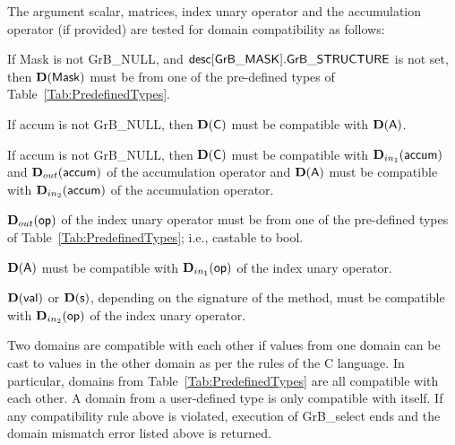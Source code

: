 The argument scalar, matrices, index unary operator and the accumulation 
operator (if provided) are tested for domain compatibility as follows:
\begin{enumerate}
    \item If {\sf Mask} is not {\sf GrB\_NULL}, and ${\sf desc[GrB\_MASK].GrB\_STRUCTURE}$
    is not set, then $\bold{D}({\sf Mask})$ must be from one of the pre-defined types of 
    Table~\ref{Tab:PredefinedTypes}.

    \item If {\sf accum} is not {\sf GrB\_NULL}, then $\bold{D}({\sf C})$ must be 
	compatible with $\bold{D}({\sf A})$.

    \item If {\sf accum} is not {\sf GrB\_NULL}, then $\bold{D}({\sf C})$ must be
    compatible with $\mbox{$\mathbf{D}_{in_{1}}$}({\sf accum})$ and $\mbox{$\mathbf{D}_{out}$}({\sf accum})$ of the accumulation operator and 
    $\bold{D}({\sf A})$ must be compatible with $\mbox{$\mathbf{D}_{in_{2}}$}({\sf accum})$ of the accumulation operator.

	\item $\mbox{$\mathbf{D}_{out}$}({\sf op})$ of the index unary operator must be from one of the pre-defined types of 
    Table~\ref{Tab:PredefinedTypes}; i.e., castable to {\sf bool}.

    \item $\bold{D}({\sf A})$ must be compatible with $\mbox{$\mathbf{D}_{in_{1}}$}({\sf op})$ of the index unary operator.
    
{\color{red}
    \item $\bold{D}({\sf val})$ or $\bold{D}({\sf s})$, depending on the signature of the method,
    must be compatible with $\mbox{$\mathbf{D}_{in_{2}}$}({\sf op})$ of the index unary operator.
}
\end{enumerate}

Two domains are compatible with each other if values from one domain can be cast 
to values in the other domain as per the rules of the C language.
In particular, domains from Table~\ref{Tab:PredefinedTypes} are all compatible 
with each other. A domain from a user-defined type is only compatible with itself.
If any compatibility rule above is violated, execution of {\sf GrB\_select} ends and 
the domain mismatch error listed above is returned.

